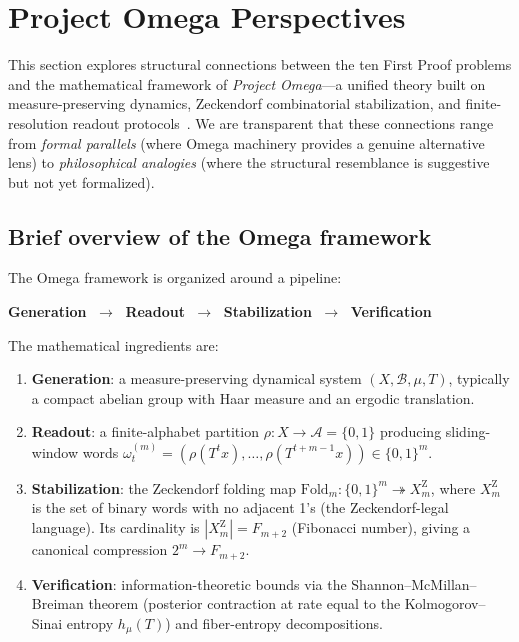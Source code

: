 \section{Project Omega Perspectives}\label{sec:omega}

This section explores structural connections between the ten First Proof
problems and the mathematical framework of \emph{Project Omega}---a
unified theory built on measure-preserving dynamics, Zeckendorf
combinatorial stabilization, and finite-resolution readout
protocols~\cite{omega-theory,omega-fop,omega-grg}.
We are transparent that these connections range from \emph{formal parallels}
(where Omega machinery provides a genuine alternative lens) to
\emph{philosophical analogies} (where the structural resemblance is
suggestive but not yet formalized).

\subsection{Brief overview of the Omega framework}

The Omega framework is organized around a pipeline:

\medskip
\centerline{%
  \textbf{Generation} $\;\to\;$
  \textbf{Readout} $\;\to\;$
  \textbf{Stabilization} $\;\to\;$
  \textbf{Verification}%
}
\medskip

\noindent
The mathematical ingredients are:
\begin{enumerate}[nosep,label=(\roman*)]
\item \textbf{Generation}: a measure-preserving dynamical system
  $(X,\mathcal B,\mu,T)$, typically a compact abelian group with
  Haar measure and an ergodic translation.
\item \textbf{Readout}: a finite-alphabet partition
  $\rho\colon X\to\mathcal A=\{0,1\}$ producing sliding-window words
  $\omega^{(m)}_t=(\rho(T^t x),\dots,\rho(T^{t+m-1}x))\in\{0,1\}^m$.
\item \textbf{Stabilization}: the Zeckendorf folding map
  $\mathrm{Fold}_m\colon\{0,1\}^m\twoheadrightarrow X^{\mathrm Z}_m$,
  where $X^{\mathrm Z}_m$ is the set of binary words with no adjacent 1's
  (the Zeckendorf-legal language).  Its cardinality is
  $|X^{\mathrm Z}_m|=F_{m+2}$ (Fibonacci number), giving a canonical
  compression $2^m\to F_{m+2}$.
\item \textbf{Verification}: information-theoretic bounds via the
  Shannon--McMillan--Breiman theorem (posterior contraction at rate
  equal to the Kolmogorov--Sinai entropy $h_\mu(T)$) and
  fiber-entropy decompositions.
\end{enumerate}

